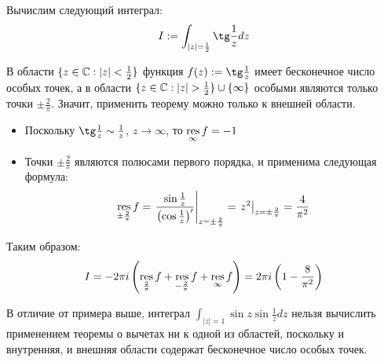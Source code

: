 \begin{unnecessary}
    \begin{example}
    	Вычислим следующий интеграл:
    	\[I := \int_{|z| = \frac12} \tg\frac1z dz\]
    	
    	В области $\{z \in \mathbb{C}: |z| < \frac12\}$ функция $f(z) := \tg\frac1z$ имеет бесконечное число особых точек, а в области $\{z \in \mathbb{C}: |z| > \frac12\} \cup \{\infty\}$ особыми являются только точки $\pm \frac2\pi$. Значит, применить теорему можно только к внешней области.
    	\begin{itemize}
    		\item Поскольку $\tg\frac1z \sim \frac1z$, $z \to \infty$, то $\operatorname*{res}\limits_\infty{f} = -1$
    		
    		\item Точки $\pm\frac2\pi$ являются полюсами первого порядка, и применима следующая формула:
    		\[\operatorname*{res}_{\pm\frac2\pi}{f} = \left.\frac{\sin\frac1z}{\left(\cos\frac1z\right)'}\right|_{z = \pm\frac2\pi} = \left.z^2\right|_{z = \pm\frac2\pi} = \frac4{\pi^2}\]
    	\end{itemize}
    	
    	Таким образом:
    	\[I = -2\pi i\left(\operatorname*{res}_{\frac2\pi}f + \operatorname*{res}_{-\frac2\pi}f + \operatorname*{res}_{\infty}f\right) = 2\pi i\left(1 - \frac8{\pi^2}\right)\]
    \end{example}
    
    \begin{note}
    	В отличие от примера выше, интеграл $\int_{|z| = 1}\sin{z}\sin\frac1zdz$ нельзя вычислить применением теоремы о вычетах ни к одной из областей, поскольку и внутренняя, и внешняя области содержат бесконечное число особых точек.
    \end{note}
\end{unnecessary}